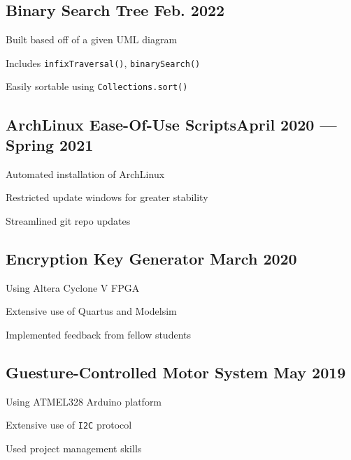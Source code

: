 \documentclass[letter,10pt]{article}
\begin{document}
\subsection{{Binary Search Tree \hfill Feb. 2022}}
\begin{zitemize}
\item Built based off of a given UML diagram
\item Includes \verb|infixTraversal()|, \verb|binarySearch()|
\item Easily sortable using \verb|Collections.sort()|
\end{zitemize}

\subsection{{ArchLinux Ease-Of-Use Scripts\hfill April 2020 --- Spring 2021}}
\begin{zitemize}
\item Automated installation of ArchLinux
\item Restricted update windows for greater stability
\item Streamlined git repo updates
\end{zitemize}

\subsection{{Encryption Key Generator \hfill March 2020}}
\begin{zitemize}
\item Using Altera Cyclone V FPGA
\item Extensive use of Quartus and Modelsim
\item Implemented feedback from fellow students
\end{zitemize}

\subsection{{Guesture-Controlled Motor System \hfill May 2019}}
\begin{zitemize}
\item Using ATMEL328 Arduino platform
\item Extensive use of \verb|I2C| protocol
\item Used project management skills
\end{zitemize}
\end{document}
